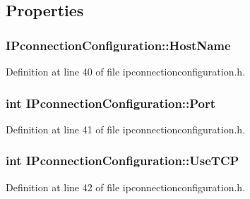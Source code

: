 \subsection{\-Properties}
\hypertarget{group___i_p_conn_plugin_gaa540a20af79b7ec845405fb81a75dd82}{
\subsubsection[{\-Host\-Name}]{ {\bf \-I\-Pconnection\-Configuration\-::\-Host\-Name}}}\label{group___i_p_conn_plugin_gaa540a20af79b7ec845405fb81a75dd82}


\-Definition at line 40 of file ipconnectionconfiguration.\-h.

\hypertarget{group___i_p_conn_plugin_ga016b44f60ba95951cdf428d88a119a97}{
\subsubsection[{\-Port}]{\setlength{\rightskip}{0pt plus 5cm}int {\bf \-I\-Pconnection\-Configuration\-::\-Port}}}\label{group___i_p_conn_plugin_ga016b44f60ba95951cdf428d88a119a97}


\-Definition at line 41 of file ipconnectionconfiguration.\-h.

\hypertarget{group___i_p_conn_plugin_ga40b7a131ca4ee4e1c315a0fc12281da8}{
\subsubsection[{\-Use\-T\-C\-P}]{\setlength{\rightskip}{0pt plus 5cm}int {\bf \-I\-Pconnection\-Configuration\-::\-Use\-T\-C\-P}}}\label{group___i_p_conn_plugin_ga40b7a131ca4ee4e1c315a0fc12281da8}


\-Definition at line 42 of file ipconnectionconfiguration.\-h.

